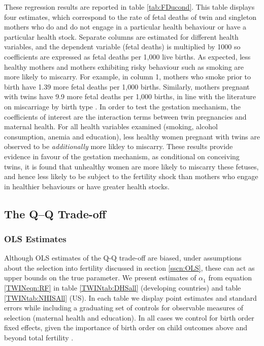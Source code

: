 \documentclass[subeqn]{article}
\begin{document}
\begin{spacing}{1.4}
These regression results are reported in table \ref{tab:FDucond}.  This table
displays four estimates, which correspond to the rate of fetal deaths of twin
and singleton mothers who do and do not engage in a particular health behaviour
or have a particular health stock.  Separate columns are estimated for different
health variables, and the dependent variable (fetal deaths) is multiplied by 1000
so coefficients are expressed as fetal deaths per 1,000 live births. As expected,
less healthy mothers and mothers exhibiting risky behaviour such as smoking are
more likely to miscarry.  For example, in column 1, mothers who smoke prior to
birth have 1.39 more fetal deaths per 1,000 births.  Similarly, mothers pregnant
with twins have 9.9 more fetal deaths per 1,000 births, in line with the
literature on miscarriage by birth type \citep{Garciaetal2002}.  In order to
test the gestation mechanism, the coefficients of interest are the interaction
terms between twin pregnancies and maternal health.  For all health variables 
examined (smoking, alcohol consumption, anemia and education), less healthy women
pregnant with twins are observed to be \emph{additionally} more likley to
miscarry. These results provide evidence in favour of the gestation mechanism,
as conditional on conceiving twins, it is found that unhealthy women are more 
likely to miscarry these fetuses, and hence less likely to be subject to the
fertility shock than mothers who engage in healthier behaviours or have greater
health stocks.

\subsection{The Q--Q Trade-off} \label{TWINsscn:QQtwins}
\subsubsection{OLS Estimates}
Although OLS estimates of the Q-Q trade-off are biased, under assumptions about
the selection into fertility discussed in section \ref{sscn:OLS}, these can
act as upper bounds on the true parameter.  We present estimates of $\alpha_1$
from equation \ref{TWINeqn:RF} in table \ref{TWINtab:DHSall} (developing
countries) and table \ref{TWINtab:NHISAll} (US). In each table we display point
estimates and standard errors while including a graduating set of controls for
observable measures of selection (maternal health and education). In all cases
we control for birth order fixed effects, given the importance of birth order
on child outcomes above and beyond total fertility \citep{Blacketal2005}.


\end{spacing}
\end{document}
